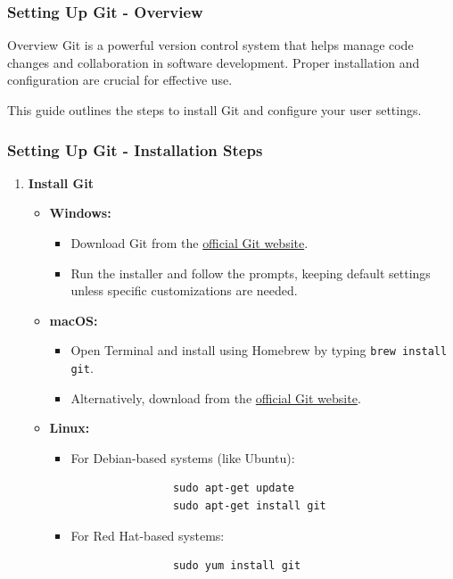 \documentclass{beamer}
\begin{document}
\begin{frame}[fragile]
    \frametitle{Setting Up Git - Overview}
    \begin{block}{Overview}
        Git is a powerful version control system that helps manage code changes and collaboration in software development. Proper installation and configuration are crucial for effective use. 
    \end{block}
    This guide outlines the steps to install Git and configure your user settings.
\end{frame}

\begin{frame}[fragile]
    \frametitle{Setting Up Git - Installation Steps}
    \begin{enumerate}
        \item \textbf{Install Git}
        \begin{itemize}
            \item \textbf{Windows:}
            \begin{itemize}
                \item Download Git from the \href{https://git-scm.com/download/win}{official Git website}.
                \item Run the installer and follow the prompts, keeping default settings unless specific customizations are needed.
            \end{itemize}
            \item \textbf{macOS:}
            \begin{itemize}
                \item Open Terminal and install using Homebrew by typing \texttt{brew install git}.
                \item Alternatively, download from the \href{https://git-scm.com/download/mac}{official Git website}.
            \end{itemize}
            \item \textbf{Linux:}
            \begin{itemize}
                \item For Debian-based systems (like Ubuntu):
                \begin{lstlisting}
                sudo apt-get update
                sudo apt-get install git
                \end{lstlisting}
                \item For Red Hat-based systems:
                \begin{lstlisting}
                sudo yum install git
                \end{lstlisting}
            \end{itemize}
        \end{itemize}
    \end{enumerate}
\end{frame}
\end{document}
